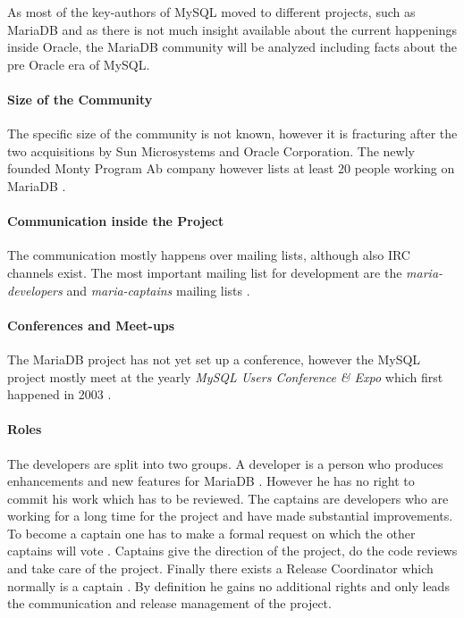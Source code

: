 As most of the key-authors of MySQL moved to different projects, such as
MariaDB and as there is not much insight available about the current happenings
inside Oracle, the MariaDB community will be analyzed including facts about the
pre Oracle era of MySQL.

\paragraph{Size of the Community}

The specific size of the community is not known, however it is fracturing after
the two acquisitions by Sun Microsystems and Oracle Corporation. The newly
founded Monty Program Ab company however lists at least 20 people working on
MariaDB \cite{MySQLBehind}.

\paragraph{Communication inside the Project}

The communication mostly happens over mailing lists, although also \ac{IRC}
channels exist. The most important mailing list for development are the
\emph{maria-developers} and \emph{maria-captains} mailing lists
\cite{MySQLDevelopers}.

\paragraph{Conferences and Meet-ups}

The MariaDB project has not yet set up a conference, however the MySQL project
mostly meet at the yearly \emph{MySQL Users Conference \& Expo} which first
happened in 2003 \cite{MySQLConference}.

\paragraph{Roles}

The developers are split into two groups. A developer is a person who produces
enhancements and new features for MariaDB
\cite{MySQLContributingCode,MySQLContributing,MySQLCaptain}. However he has no
right to commit his work which has to be reviewed. The captains are developers
who are working for a long time for the project and have made substantial
improvements. To become a captain one has to make a formal request on which the
other captains will vote \cite{MySQLCaptain}. Captains give the direction of
the project, do the code reviews and take care of the project. Finally there
exists a Release Coordinator which normally is a captain
\cite{MySQLReleaseCoordinator}. By definition he gains no additional rights and
only leads the communication and release management of the project.


